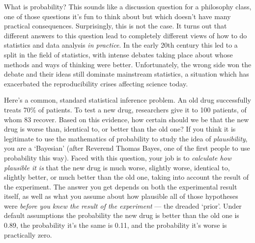 \documentclass[a4paper, 12pt]{article}
\title{}
\author{Brendon J. Brewer}
\begin{document}
\sffamily
\maketitle

What is probability? This sounds like a discussion question for a
philosophy class, one of those questions it's fun to think about but which
doesn't have many practical consequences. Surprisingly, this is not the case.
It turns out that different answers to this question lead to completely
different views of how to do statistics and data analysis {\em in practice}.
In the early 20th century this led to a split in the field of statistics,
with intense debates taking place about whose methods and ways of thinking
were better. Unfortunately, the wrong side won the debate and their
ideas still dominate mainstream statistics, a situation which
has exacerbated the reproducibility crises affecting science today.

Here's a common, standard statistical inference problem. An old drug
successfully treats 70\% of patients. To test a new drug, researchers give it
to 100 patients, of whom 83 recover. Based on this evidence, how certain
should we be that the new drug is worse than, identical to, or better than the
old one? If you think it is legitimate to use the mathematics of probability
to study the idea of {\em plausibility}, you are a `Bayesian' (after Reverend
Thomas Bayes, one of the first people to use probability this way). Faced with
this question, your job is to {\em calculate how plausible it is} that the new
drug is much worse, slightly worse, identical to, slightly better, or much better
than the old one, taking into account the result of the experiment. The answer
you get
depends on both the experimental result itself, as well as what you assume
about how plausible all of those hypotheses were {\em before you knew the result
of the experiment} --- the dreaded `prior'.
Under default assumptions the probability the new drug is better
than the old one is 0.89, the probability it's the same is 0.11, and the
probability it's worse is practically zero.
\end{document}

